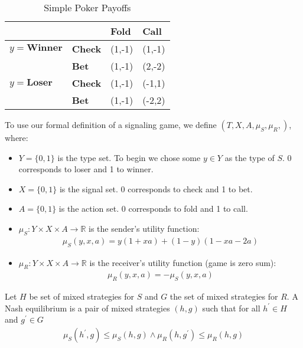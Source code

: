 \documentclass{article}
\begin{document}
\begin{table}[H]
	\centering
	\caption{Simple Poker Payoffs}
	\label{simplepokerpayoffs}
	\begin{tabular}{ll|l|l|}
		\cline{3-4}&       & \textbf{Fold} & \textbf{Call} \\ \hline
		\multicolumn{1}{|l|}{$y=\textbf{Winner}$} & \textbf{Check} & (1,-1)  & (1,-1)  \\ \cline{2-4}
		\multicolumn{1}{|l|}{}        & \textbf{Bet}   & (1,-1)  & (2,-2)  \\ \hline
		\multicolumn{1}{|l|}{$y=\textbf{Loser}$}  & \textbf{Check} & (1,-1)  & (-1,1)  \\ \cline{2-4}
		\multicolumn{1}{|l|}{}        & \textbf{Bet}   & (1,-1)  & (-2,2) \\ \hline
	\end{tabular}
\end{table}

To use our formal definition of a signaling game, we define $\left(T, X, A, \mu_S, \mu_R, \right)$, where:
\begin{itemize}
    \item $Y = \lbrace 0, 1 \rbrace$ is the type set. To begin we chose some $y \in Y$ as the type of $S$. 0 corresponds to loser and 1 to winner.
    \item $X = \lbrace 0, 1 \rbrace$ is the signal set. 0 corresponds to check and 1 to bet.
    \item $A = \lbrace 0, 1 \rbrace$ is the action set. 0 corresponds to fold and 1 to call.
    \item $\mu_S: Y \times X \times A \longrightarrow \mathbb{R}$ is the sender's utility function:
        \begin{align*}
\mu_S(y, x, a) = y(1+xa) + (1-y)(1-xa-2a)
        \end{align*}
    \item $\mu_R: Y \times X \times A \longrightarrow \mathbb{R}$ is the receiver's utility function (game is zero sum):
        \begin{align*}
\mu_R(y, x, a) = -\mu_S(y, x, a)
        \end{align*}
\end{itemize}

Let $H$ be set of mixed strategies for $S$ and $G$ the set of mixed strategies for $R$. A Nash equilibrium is a pair of mixed strategies $(h,g)$ such that for all $h^\prime \in H$ and $g^\prime \in G$
\begin{align*}
    \mu_S(h^\prime,g) \le \mu_S(h,g) \land
    \mu_R(h,g^\prime) \le \mu_R(h,g)
\end{align*}
\end{document}

